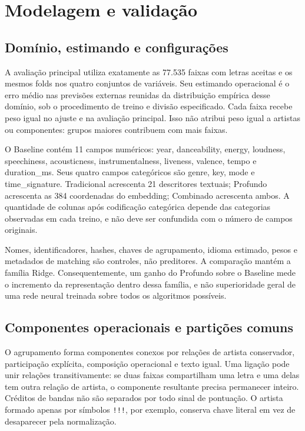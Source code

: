 \chapter{Modelagem e validação}\label{cap:modelagem}
\section{Domínio, estimando e configurações}
A avaliação principal utiliza exatamente as 77.535 faixas com letras aceitas e os mesmos folds nos quatro conjuntos de variáveis. Seu estimando operacional é o erro médio nas previsões externas reunidas da distribuição empírica desse domínio, sob o procedimento de treino e divisão especificado. Cada faixa recebe peso igual no ajuste e na avaliação principal. Isso não atribui peso igual a artistas ou componentes: grupos maiores contribuem com mais faixas.

O Baseline contém 11 campos numéricos: year, danceability, energy, loudness, speechiness, acousticness, instrumentalness, liveness, valence, tempo e duration\_ms. Seus quatro campos categóricos são genre, key, mode e time\_signature. Tradicional acrescenta 21 descritores textuais; Profundo acrescenta as 384 coordenadas do embedding; Combinado acrescenta ambos. A quantidade de colunas após codificação categórica depende das categorias observadas em cada treino, e não deve ser confundida com o número de campos originais.

Nomes, identificadores, hashes, chaves de agrupamento, idioma estimado, pesos e metadados de matching são controles, não preditores. A comparação mantém a família Ridge. Consequentemente, um ganho do Profundo sobre o Baseline mede o incremento da representação dentro dessa família, e não superioridade geral de uma rede neural treinada sobre todos os algoritmos possíveis.

\section{Componentes operacionais e partições comuns}
O agrupamento forma componentes conexos por relações de artista conservador, participação explícita, composição operacional e texto igual. Uma ligação pode unir relações transitivamente: se duas faixas compartilham uma letra e uma delas tem outra relação de artista, o componente resultante precisa permanecer inteiro. Créditos de bandas não são separados por todo sinal de pontuação. O artista formado apenas por símbolos \texttt{!!!}, por exemplo, conserva chave literal em vez de desaparecer pela normalização.


